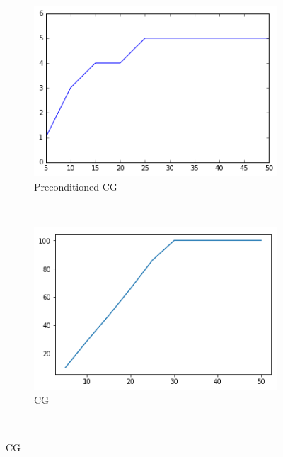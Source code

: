 \documentclass[letterpaper,12pt]{article}
\begin{document}
\begin{enumerate}
\begin{figure}[H]
    \centering
    \begin{subfigure}[b]{0.4\textwidth}
        \includegraphics[width=\textwidth]{iter}
        \caption{Preconditioned CG}
        \label{fig:gull}
    \end{subfigure}
    ~ %
    \begin{subfigure}[b]{0.4\textwidth}
        \includegraphics[width=\textwidth]{it2}
        \caption{CG}
        \label{fig:tiger}
    \end{subfigure}
    ~ %


\end{figure}
\end{enumerate}
\end{document}
